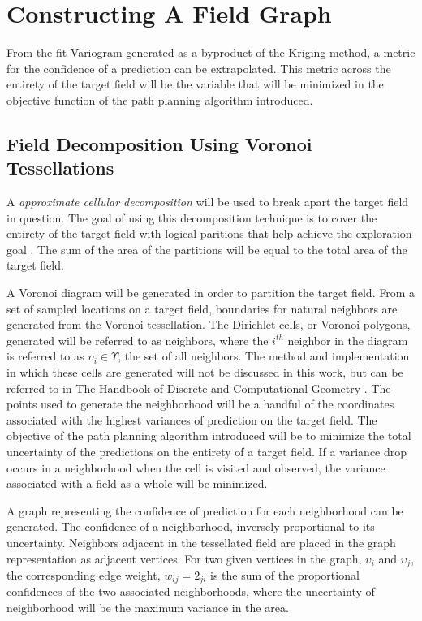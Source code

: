 \chapter{Constructing A Field Graph} \label{ch:graph_construction}
From the fit Variogram generated as a byproduct of the Kriging method, a metric for the confidence of a prediction can be extrapolated. This metric across the entirety of the target field will be the variable that will be minimized in the objective function of the path planning algorithm introduced.

\section{Field Decomposition Using Voronoi Tessellations}
A \textit{approximate cellular decomposition} will be used to break apart the target field in question. The goal of using this decomposition technique is to cover the entirety of the target field with logical paritions that help achieve the exploration goal \cite{choset:coverage}. The sum of the area of the partitions will be equal to the total area of the target field.

A Voronoi diagram will be generated in order to partition the target field. From a set of sampled locations on a target field, boundaries for natural neighbors are generated from the Voronoi tessellation. The Dirichlet cells, or Voronoi polygons, generated will be referred to as neighbors, where the $i^{th}$ neighbor in the diagram is referred to as $\upsilon_i \in \Upsilon$, the set of all neighbors. The method and implementation in which these cells are generated will not be discussed in this work, but can be referred to in The Handbook of Discrete and Computational Geometry \cite{goodman:voronoi}. The points used to generate the neighborhood will be a handful of the coordinates associated with the highest variances of prediction on the target field. The objective of the path planning algorithm introduced will be to minimize the total uncertainty of the predictions on the entirety of a target field. If a variance drop occurs in a neighborhood when the cell is visited and observed, the variance associated with a field as a whole will be minimized.

A graph representing the confidence of prediction for each neighborhood can be generated. The confidence of a neighborhood, inversely proportional to its uncertainty. Neighbors adjacent in the tessellated field are placed in the graph representation as adjacent vertices. For two given vertices in the graph, $\upsilon_i$ and $\upsilon_j$, the corresponding edge weight, $w_{ij}=2_{ji}$ is the sum of the proportional confidences of the two associated neighborhoods, where the uncertainty of neighborhood will be the maximum variance in the area.

